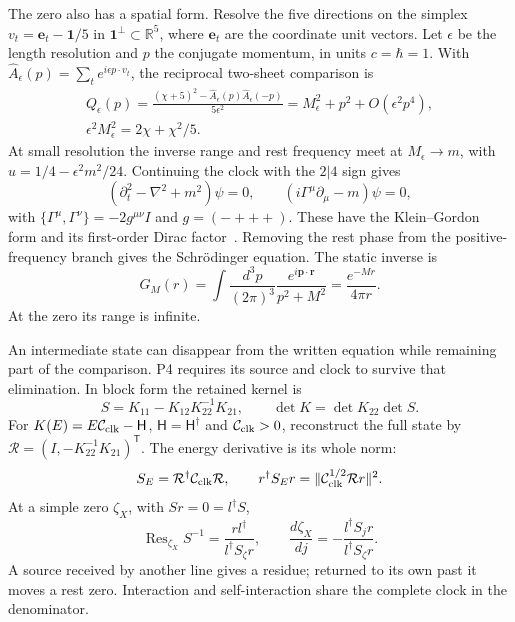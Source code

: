 \documentclass[aps,prx,reprint,longbibliography]{revtex4-2}
\begin{document}
The zero also has a spatial form. Resolve the five directions on the simplex $v_t=\mathbf e_t-\mathbf1/5$ in $\mathbf1^\perp\subset\mathbb R^5$, where $\mathbf e_t$ are the coordinate unit vectors. Let $\epsilon$ be the length resolution and $p$ the conjugate momentum, in units $c=\hbar=1$. With $\widehat A_\epsilon(p)=\sum_te^{i\epsilon p\cdot v_t}$, the reciprocal two-sheet comparison is
\begin{equation}
 \begin{gathered}
 Q_\epsilon(p)=\frac{(\chi+5)^2-\widehat A_\epsilon(p)\widehat A_\epsilon(-p)}{5\epsilon^2}
 =M_\epsilon^2+p^2+O(\epsilon^2p^4),\\
 \epsilon^2M_\epsilon^2=2\chi+\chi^2/5.
 \end{gathered}
 \label{eq:chart}
\end{equation}
At small resolution the inverse range and rest frequency meet at $M_\epsilon\to m$, with $u=1/4-\epsilon^2m^2/24$. Continuing the clock with the $2|4$ sign gives
\begin{equation}
 (\partial_t^2-\nabla^2+m^2)\psi=0,\qquad
 (i\Gamma^\mu\partial_\mu-m)\psi=0,
 \label{eq:free_fields}
\end{equation}
with $\{\Gamma^\mu,\Gamma^\nu\}=-2g^{\mu\nu}I$ and $g=(-+++)$. These have the Klein--Gordon form and its first-order Dirac factor~\cite{Dirac}. Removing the rest phase from the positive-frequency branch gives the Schr\"odinger equation. The static inverse is
\begin{equation}
 G_M(r)=\int\frac{d^3p}{(2\pi)^3}\frac{e^{i\mathbf p\cdot\mathbf r}}{p^2+M^2}
 =\frac{e^{-Mr}}{4\pi r}.
 \label{eq:static}
\end{equation}
At the zero its range is infinite.

An intermediate state can disappear from the written equation while remaining part of the comparison. P4 requires its source and clock to survive that elimination. In block form the retained kernel is
\begin{equation}
 S=K_{11}-K_{12}K_{22}^{-1}K_{21},\qquad
 \det K=\det K_{22}\det S.
 \label{eq:schur}
\end{equation}
For $K(E)=E\mathcal C_{\rm clk}-\mathsf H$, $\mathsf H=\mathsf H^\dagger$ and $\mathcal C_{\rm clk}>0$, reconstruct the full state by $\mathcal R=(I,-K_{22}^{-1}K_{21})^{\mathsf T}$. The energy derivative is its whole norm:
\begin{equation}
 S_E=\mathcal R^\dagger\mathcal C_{\rm clk}\mathcal R,\qquad
 r^\dagger S_Er=\|\mathcal C_{\rm clk}^{1/2}\mathcal Rr\|^2.
 \label{eq:full_norm}
\end{equation}
At a simple zero $\zeta_X$, with $Sr=0=l^\dagger S$,
\begin{equation}
 \operatorname{Res}_{\zeta_X}S^{-1}=\frac{rl^\dagger}{l^\dagger S_\zeta r},\qquad
 \frac{d\zeta_X}{dj}=-\frac{l^\dagger S_jr}{l^\dagger S_\zeta r}.
 \label{eq:mass_strength}
\end{equation}
A source received by another line gives a residue; returned to its own past it moves a rest zero. Interaction and self-interaction share the complete clock in the denominator.
\end{document}
